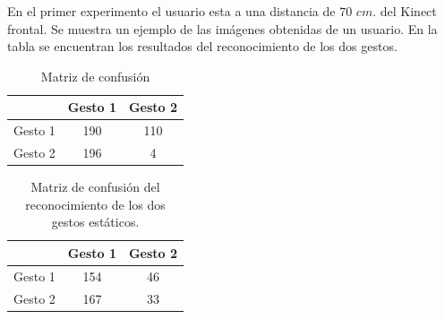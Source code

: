 
En el primer experimento el usuario esta a una distancia de $70$ $cm.$ del Kinect frontal. Se muestra un ejemplo de las imágenes obtenidas de un usuario. En la tabla se encuentran los resultados del reconocimiento de los dos gestos.  


\begin{table}[h!] 
\begin{center}
\begin{tabular}{ r || c | c |} 
 
        & Gesto 1 & Gesto 2 \\ \hline \hline  
Gesto 1 & 190     &  110     \\ \hline  
Gesto 2 & 196     &  4     \\   

\end{tabular}
\end{center} 
\caption{Matriz de confusión}
\end{table}  

\begin{table}[h!] 
\begin{center}
\begin{tabular}{ r || c | c |} 
 
        & Gesto 1 & Gesto 2 \\ \hline \hline  
Gesto 1 & 154     &  46     \\ \hline  
Gesto 2 & 167     &  33     \\   

\end{tabular}
\end{center} 
\caption{Matriz de confusión del reconocimiento de los dos gestos estáticos.}
\end{table} 



